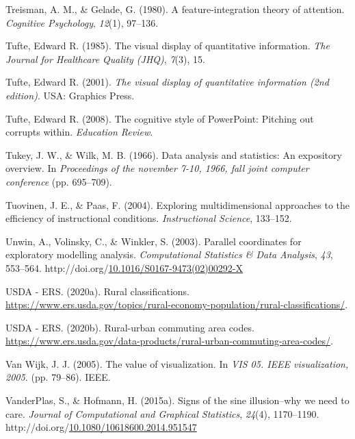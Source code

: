 \documentclass[print]{nuthesis}
\newlength{\cslhangindent}
\newenvironment{CSLReferences}[2]%
{\setlength{\parindent}{0pt}%
\everypar{\setlength{\hangindent}{\cslhangindent}}\ignorespaces}%
{\par}
\begin{document}
\begin{CSLReferences}{1}{0}
\leavevmode{}%
Treisman, A. M., \& Gelade, G. (1980). A feature-integration theory of attention. \emph{Cognitive Psychology}, \emph{12}(1), 97--136.

\leavevmode{}%
Tufte, Edward R. (1985). The visual display of quantitative information. \emph{The Journal for Healthcare Quality (JHQ)}, \emph{7}(3), 15.

\leavevmode{}%
Tufte, Edward R. (2001). \emph{The visual display of quantitative information (2nd edition)}. USA: Graphics Press.

\leavevmode{}%
Tufte, Edward R. (2008). The cognitive style of PowerPoint: Pitching out corrupts within. \emph{Education Review}.

\leavevmode{}%
Tukey, J. W., \& Wilk, M. B. (1966). Data analysis and statistics: An expository overview. In \emph{Proceedings of the november 7-10, 1966, fall joint computer conference} (pp. 695--709).

\leavevmode{}%
Tuovinen, J. E., \& Paas, F. (2004). Exploring multidimensional approaches to the efficiency of instructional conditions. \emph{Instructional Science}, 133--152.

\leavevmode{}%
Unwin, A., Volinsky, C., \& Winkler, S. (2003). Parallel coordinates for exploratory modelling analysis. \emph{Computational Statistics \& Data Analysis}, \emph{43}, 553--564. http://doi.org/\href{https://doi.org/10.1016/S0167-9473(02)00292-X}{10.1016/S0167-9473(02)00292-X}

\leavevmode{}%
USDA - ERS. (2020a). Rural classifications. \url{https://www.ers.usda.gov/topics/rural-economy-population/rural-classifications/}.

\leavevmode{}%
USDA - ERS. (2020b). Rural-urban commuting area codes. \url{https://www.ers.usda.gov/data-products/rural-urban-commuting-area-codes/}.

\leavevmode{}%
Van Wijk, J. J. (2005). The value of visualization. In \emph{VIS 05. IEEE visualization, 2005.} (pp. 79--86). IEEE.

\leavevmode{}%
VanderPlas, S., \& Hofmann, H. (2015a). Signs of the sine illusion--why we need to care. \emph{Journal of Computational and Graphical Statistics}, \emph{24}(4), 1170--1190. http://doi.org/\href{https://doi.org/10.1080/10618600.2014.951547}{10.1080/10618600.2014.951547}


\end{CSLReferences}
\end{document}

